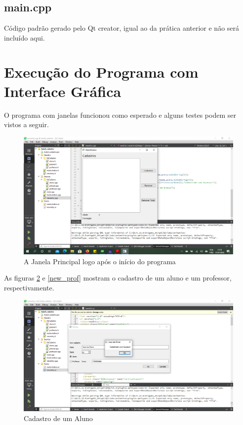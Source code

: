 \documentclass[12pt,a4paper]{article}
\begin{document}
\subsection*{main.cpp}
Código padrão gerado pelo Qt creator, igual ao da prática anterior e não será incluído aqui.

\section{Execução do Programa com Interface Gráfica}
O programa com janelas funcionou como esperado e alguns testes podem ser vistos a seguir.
\begin{figure}[H]
    \centering
    \includegraphics[width=\textwidth]{teste_vazio}
    \caption{A Janela Principal logo após o início do programa}
    \label{teste_empty}
\end{figure}
As figuras \ref{new_aluno} e \ref{new_prof} mostram o cadastro de um aluno e um professor, respectivamente.
\begin{figure}[h]
    \centering
    \includegraphics[width=\textwidth]{new_aluno}
    \caption{Cadastro de um Aluno}
    \label{new_aluno}
\end{figure}
\end{document}
